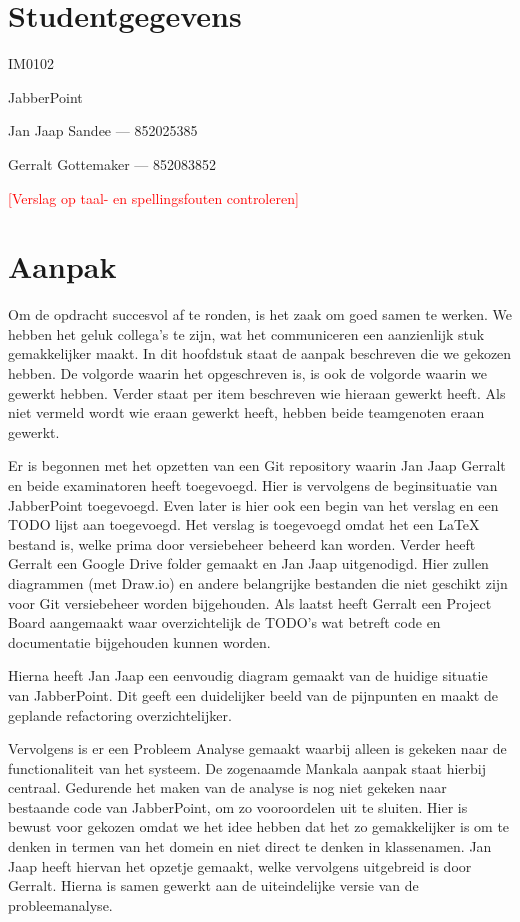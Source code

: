\documentclass[a4paper]{article}
\newcommand{\todo}[1]{\textcolor{red}{[#1]}}
\begin{document}
\pagestyle{fancy}

\section*{Studentgegevens}
\begin{description}
	\item [Cursuscode] IM0102
	\item JabberPoint
    \item Jan Jaap Sandee --- 852025385
	\item Gerralt Gottemaker --- 852083852
\end{description}
\todo{Verslag op taal- en spellingsfouten controleren}

\section*{Aanpak}
Om de opdracht succesvol af te ronden, is het zaak om goed samen te werken. We hebben het geluk collega's te zijn, wat het communiceren een aanzienlijk stuk gemakkelijker maakt. In dit hoofdstuk staat de aanpak beschreven die we gekozen hebben. De volgorde waarin het opgeschreven is, is ook de volgorde waarin we gewerkt hebben. Verder staat per item beschreven wie hieraan gewerkt heeft. Als niet vermeld wordt wie eraan gewerkt heeft, hebben beide teamgenoten eraan gewerkt.

Er is begonnen met het opzetten van een Git repository waarin Jan Jaap Gerralt en beide examinatoren heeft toegevoegd. Hier is vervolgens de beginsituatie van JabberPoint toegevoegd. Even later is hier ook een begin van het verslag en een TODO lijst aan toegevoegd. Het verslag is toegevoegd omdat het een LaTeX bestand is, welke prima door versiebeheer beheerd kan worden. Verder heeft Gerralt een Google Drive folder gemaakt en Jan Jaap uitgenodigd. Hier zullen diagrammen (met Draw.io) en andere belangrijke bestanden die niet geschikt zijn voor Git versiebeheer worden bijgehouden. Als laatst heeft Gerralt een Project Board aangemaakt waar overzichtelijk de TODO's wat betreft code en documentatie bijgehouden kunnen worden.

Hierna heeft Jan Jaap een eenvoudig diagram gemaakt van de huidige situatie van JabberPoint. Dit geeft een duidelijker beeld van de pijnpunten en maakt de geplande refactoring overzichtelijker.

Vervolgens is er een Probleem Analyse gemaakt waarbij alleen is gekeken naar de functionaliteit van het systeem. De zogenaamde Mankala aanpak staat hierbij centraal. Gedurende het maken van de analyse is nog niet gekeken naar bestaande code van JabberPoint, om zo vooroordelen uit te sluiten. Hier is bewust voor gekozen omdat we het idee hebben dat het zo gemakkelijker is om te denken in termen van het domein en niet direct te denken in klassenamen. Jan Jaap heeft hiervan het opzetje gemaakt, welke vervolgens uitgebreid is door Gerralt. Hierna is samen gewerkt aan de uiteindelijke versie van de probleemanalyse.
\end{document}
